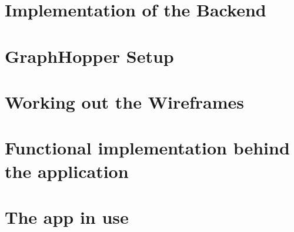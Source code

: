 \section{Implementation of the Backend}


\section{GraphHopper Setup}

\section{Working out the Wireframes}


\section{Functional implementation behind the application}


\section{The app in use}
